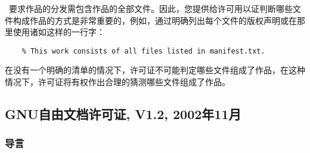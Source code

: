 \begin{LPPLicense}
    \LPPL\ 要求作品的分发需包含作品的全部文件。因此，您提供给许可用以证判断哪些文件构成作品的方式是非常重要的，例如，通过明确列出每个文件的版权声明或在那里使用诸如这样的一行字：
\begin{verbatim}
    % This work consists of all files listed in manifest.txt.
\end{verbatim}

    在没有一个明确的清单的情况下，许可证不可能判定哪些文件组成了作品，在这种情况下，许可证将有权作出合理的猜测哪些文件组成了作品。
\end{LPPLicense}


\subsection{GNU自由文档许可证, V1.2, 2002年11月} %
\label{label_fdl}


\subsubsection{导言}



